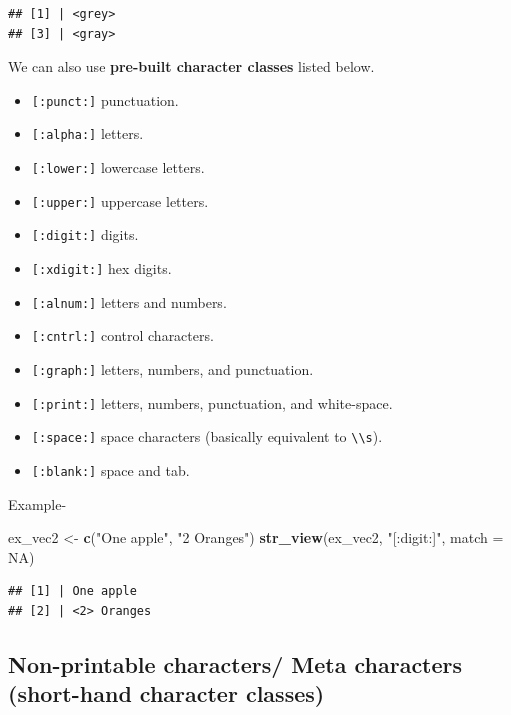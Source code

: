 \documentclass[
]{book}
\newenvironment{Shaded}{\begin{snugshade}}{\end{snugshade}}
\newcommand{\AttributeTok}[1]{\textcolor[rgb]{0.13,0.29,0.53}{#1}}
\newcommand{\ConstantTok}[1]{\textcolor[rgb]{0.56,0.35,0.01}{#1}}
\newcommand{\FunctionTok}[1]{\textcolor[rgb]{0.13,0.29,0.53}{\textbf{#1}}}
\newcommand{\NormalTok}[1]{#1}
\newcommand{\OtherTok}[1]{\textcolor[rgb]{0.56,0.35,0.01}{#1}}
\newcommand{\StringTok}[1]{\textcolor[rgb]{0.31,0.60,0.02}{#1}}
\providecommand{\tightlist}{%
  \setlength{\itemsep}{0pt}\setlength{\parskip}{0pt}}
\begin{document}
\begin{verbatim}
## [1] | <grey>
## [3] | <gray>
\end{verbatim}

We can also use \textbf{pre-built character classes} listed below.

\begin{itemize}
\tightlist
\item
  \texttt{{[}:punct:{]}} punctuation.
\item
  \texttt{{[}:alpha:{]}} letters.
\item
  \texttt{{[}:lower:{]}} lowercase letters.
\item
  \texttt{{[}:upper:{]}} uppercase letters.
\item
  \texttt{{[}:digit:{]}} digits.
\item
  \texttt{{[}:xdigit:{]}} hex digits.
\item
  \texttt{{[}:alnum:{]}} letters and numbers.
\item
  \texttt{{[}:cntrl:{]}} control characters.
\item
  \texttt{{[}:graph:{]}} letters, numbers, and punctuation.
\item
  \texttt{{[}:print:{]}} letters, numbers, punctuation, and white-space.
\item
  \texttt{{[}:space:{]}} space characters (basically equivalent to \texttt{\textbackslash{}\textbackslash{}s}).
\item
  \texttt{{[}:blank:{]}} space and tab.
\end{itemize}

Example-

\begin{Shaded}
\begin{Highlighting}[]
\NormalTok{ex\_vec2 }\OtherTok{\textless{}{-}} \FunctionTok{c}\NormalTok{(}\StringTok{"One apple"}\NormalTok{, }\StringTok{"2 Oranges"}\NormalTok{)}
\FunctionTok{str\_view}\NormalTok{(ex\_vec2, }\StringTok{"[:digit:]"}\NormalTok{, }\AttributeTok{match =} \ConstantTok{NA}\NormalTok{)}
\end{Highlighting}
\end{Shaded}

\begin{verbatim}
## [1] | One apple
## [2] | <2> Oranges
\end{verbatim}

\hypertarget{non-printable-characters-meta-characters-short-hand-character-classes}{%
\subsection{Non-printable characters/ Meta characters (short-hand character classes)}\label{non-printable-characters-meta-characters-short-hand-character-classes}}
\end{document}
